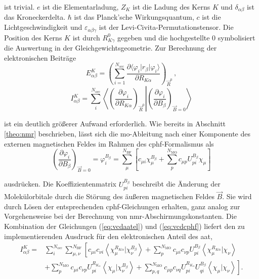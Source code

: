 	ist trivial. $e$ ist die Elementarladung, $Z_K$ ist die Ladung des Kerns $K$ und $\delta_{\alpha\beta}$ ist das Kroneckerdelta. $\hbar$ ist das Planck'sche Wirkungsquantum, $c$ ist die Lichtgeschwindigkeit und $\varepsilon_{\alpha\beta\gamma}$ ist der Levi-Civita-Permutationstensor. Die Position des Kerns $K$ ist durch $R^0_{K\gamma}$ gegeben und die hochgestellte $0$ symbolisiert die Auswertung in der Gleichgewichtsgeometrie. Zur Berechnung der elektronischen Beiträge 
    \begin{equation}
      E^K_{\alpha\beta}=\left(\sum_{i=1}^{N_{\text{occ}}}\frac{\partial \langle\varphi_i\vert r_\beta\vert\varphi_i\rangle}{\partial R_{K\alpha}}\right)_{\vec{R}^0}\, , 
    \end{equation}
    \begin{equation}\label{eq:vcdaatel}
      I^K_{\alpha\beta}=\sum_{i}^{N_{\text{occ}}}\left\langle\left.\left(\frac{\partial \varphi_i}{\partial R_{K\alpha}}\right)_{\vec{R}^0}\right|\left(\frac{\partial \varphi_i}{\partial B_\beta}\right)_{\vec{B}=0}\right\rangle
    \end{equation}
    
    ist ein deutlich größerer Aufwand erforderlich. Wie bereits in Abschnitt \ref{theo:nmr} beschrieben, lässt sich die \ac{mo}-Ableitung nach einer Komponente des externen magnetischen Feldes im Rahmen des \ac{cphf}-Formalismus als 
    \begin{equation}\label{eq:vcdcphf}
    \left(\frac{\partial \varphi_i}{\partial B_\beta}\right)_{\vec{B}=0}=\varphi_i^{B_\beta}=\sum_{\mu}^{N_{\text{BF}}}\left[c_{\mu i}\chi_\mu^{B_\beta}+\sum_{p}^{N_{\text{MO}}}c_{\mu p}U_{pi}^{B_\beta}\chi_\mu\right]
	\end{equation}
	
	ausdrücken. Die Koeffizientenmatrix $U_{pi}^{B_\beta}$ beschreibt die Änderung der Molekülorbitale durch die Störung des äußeren magnetischen Feldes $\vec{B}$. Sie wird durch Lösen der entsprechenden \ac{cphf}-Gleichungen erhalten, ganz analog zur Vorgehensweise bei der Berechnung von \ac{nmr}-Abschirmungskonstanten. Die Kombination der Gleichungen (\ref{eq:vcdaatel}) und  (\ref{eq:vcdcphf}) liefert den zu implementierenden Ausdruck für den elektronischen Anteil des \ac{aat},
	\begin{equation}\label{eq:vcdaatelfinal}
	\begin{aligned}
	I^K_{\alpha\beta}=&\sum_{i}^{N_{\text{occ}}}\sum_{\mu,\nu}^{N_{\text{BF}}}\left[c_{\mu i}c_{\nu i}\left\langle\chi_\mu^{R_{K\alpha}}\vert\chi_\nu^{B_\beta}\right\rangle+\sum_{p}^{N_{\text{MO}}}c_{\mu i}c_{\nu p}U_{pi}^{B_\beta}\left\langle\chi_\mu^{R_{K\alpha}}\vert\chi_\nu\right\rangle\right.\\
	&\left.+\sum_{p}^{N_{\text{MO}}}c_{\mu i}c_{\nu p}U_{pi}^{R_{K_\alpha}}\left\langle\chi_\mu\vert\chi_\nu^{B_{\beta}}\right\rangle+\sum_{p,q}^{N_{\text{MO}}}c_{\mu p}c_{\nu q}U_{pi}^{R_{K_\alpha}}U_{qi}^{B_\beta}\left\langle\chi_\mu\vert\chi_\nu\right\rangle\right].
	\end{aligned}
	\end{equation}
	
